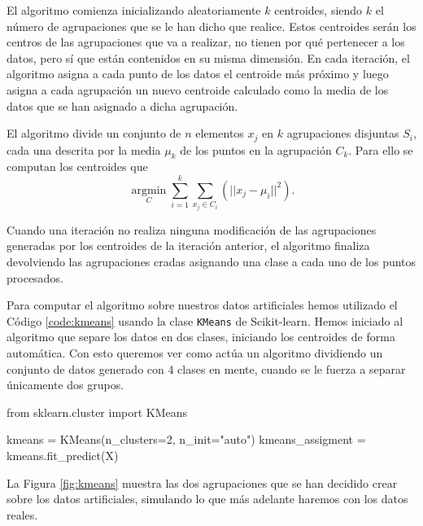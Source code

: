 El algoritmo comienza inicializando aleatoriamente $ k $ centroides, siendo $ k $ el número de agrupaciones que se le han dicho que realice. Estos centroides serán los centros de las agrupaciones que va a realizar, no tienen por qué pertenecer a los datos, pero sí que están contenidos en su misma dimensión. En cada iteración, el algoritmo asigna a cada punto de los datos el centroide más próximo y luego asigna a cada agrupación un nuevo centroide calculado como la media de los datos que se han asignado a dicha agrupación.

El algoritmo divide un conjunto de $ n $ elementos $ x_j $ en $ k $ agrupaciones disjuntas $ S_i $, cada una descrita por la media $ \mu_k $ de los puntos en la agrupación $ C_k $. Para ello se computan los centroides que 
\begin{equation}
  \underset{C}{\operatorname{arg min}} \sum_{i=1}^k \sum_{x_j \in C_i}  (|| x_j - \mu_i||^2).
\end{equation}

Cuando una iteración no realiza ninguna modificación de las agrupaciones generadas por los centroides de la iteración anterior, el algoritmo finaliza devolviendo las agrupaciones cradas asignando una clase a cada uno de los puntos procesados.

Para computar el algoritmo sobre nuestros datos artificiales hemos utilizado el Código \ref{code:kmeans} usando la clase \texttt{KMeans} de Scikit-learn. Hemos iniciado al algoritmo que separe los datos en dos clases, iniciando los centroides de forma automática. Con esto queremos ver como actúa un algoritmo dividiendo un conjunto de datos generado con 4 clases en mente, cuando se le fuerza a separar únicamente dos grupos.

\begin{mypython}[float={h}, caption={k-medias.}, label={code:kmeans}]
  from sklearn.cluster import KMeans

  kmeans = KMeans(n_clusters=2, n_init="auto")
  kmeans_assigment = kmeans.fit_predict(X)
\end{mypython}

La Figura \ref{fig:kmeans} muestra las dos agrupaciones que se han decidido crear sobre los datos artificiales, simulando lo que más adelante haremos con los datos reales.

